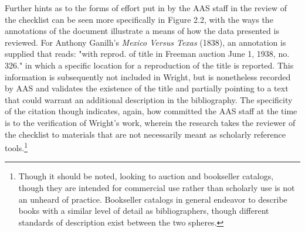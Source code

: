 Further hints as to the forms of effort put in by the AAS staff in the review of the checklist can be seen more specifically in Figure 2.2, with the ways the annotations of the document illustrate a means of how the data presented is reviewed. For Anthony Ganilh's \textit{Mexico Versus Texas} (1838), an annotation is supplied that reads: "with reprod. of title in Freeman auction June 1, 1938, no. 326." in which a specific location for a reproduction of the title is reported. This information is subsequently not included in Wright, but is nonetheless recorded by AAS and validates the existence of the title and partially pointing to a text that could warrant an additional description in the bibliography. The specificity of the citation though indicates, again, how committed the AAS staff at the time is to the verification of Wright's work, wherein the research takes the reviewer of the checklist to materials that are not necessarily meant as scholarly reference tools.\footnote{Though it should be noted, looking to auction and bookseller catalogs, though they are intended for commercial use rather than scholarly use is not an unheard of practice. Bookseller catalogs in general endeavor to describe books with a similar level of detail as bibliographers, though different standards of description exist between the two spheres.}

